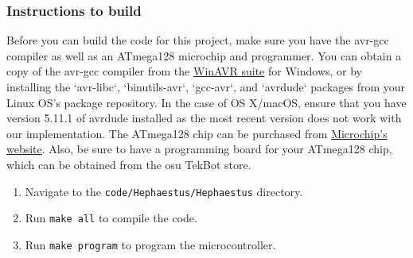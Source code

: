\subsubsection{Instructions to build}

Before you can build the code for this project, make sure you have the avr-gcc 
compiler as well as an ATmega128 microchip and programmer. You can obtain a 
copy of the avr-gcc compiler from the 
\href{http://winavr.sourceforge.net/}{WinAVR suite} for Windows, or by 
installing the `avr-libc`, `binutils-avr`, `gcc-avr`, and `avrdude` packages 
from your Linux OS's package repository. In the case of OS X/macOS, ensure that 
you have version 5.11.1 of avrdude installed as the most recent version does 
not work with our implementation. The ATmega128 chip can be purchased from 
\href{https://www.microchip.com/wwwproducts/en/ATMEGA128}{Microchip's website}.
Also, be sure to have a programming board for your ATmega128 chip, which can be 
obtained from the \gls{osu} TekBot store.

\begin{enumerate}
	\item{Navigate to the \texttt{code/Hephaestus/Hephaestus} directory.}
	\item{Run \texttt{make all} to compile the code.}
	\item{Run \texttt{make program} to program the microcontroller.}
\end{enumerate}
